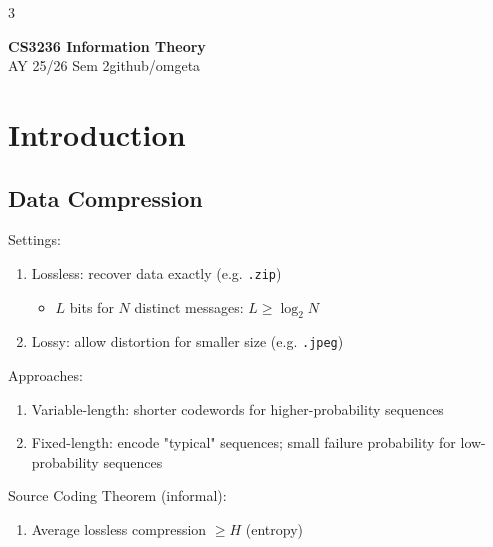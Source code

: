 \documentclass[12pt, a4paper]{article}
\newcommand{\mytitle}{CS3236 Information Theory}
\newcommand{\myauthor}{github/omgeta}
\newcommand{\mydate}{AY 25/26 Sem 2}
\begin{document}
\raggedright
\footnotesize
\begin{multicols*}{3}
\setlength{\premulticols}{1pt}
\setlength{\postmulticols}{1pt}
\setlength{\multicolsep}{1pt}
\setlength{\columnsep}{2pt}

{\normalsize{\textbf{\mytitle}}}\\
{\footnotesize{\mydate\hspace{2pt}\textemdash\hspace{2pt}\myauthor}}
\section{Introduction}
\subsection{Data Compression}
Settings:
\begin{enumerate}[\roman*.]
  \item Lossless: recover data exactly (e.g. \texttt{.zip})
    \begin{itemize}[leftmargin=*]\vspace{3pt}
      \item $L$ bits for $N$ distinct messages: $L \geq \log_2 N$ 
    \end{itemize}
  \item Lossy: allow distortion for smaller size (e.g. \texttt{.jpeg})
\end{enumerate}

Approaches:
\begin{enumerate}[\roman*.]
  \item Variable-length: shorter codewords for higher-probability sequences
  \item Fixed-length: encode "typical" sequences; small failure probability for low-probability sequences
\end{enumerate}

Source Coding Theorem (informal):
\begin{enumerate}[\roman*.]
  \item Average lossless compression $\geq H$ (entropy)
\end{enumerate}


\end{multicols*}
\end{document}
